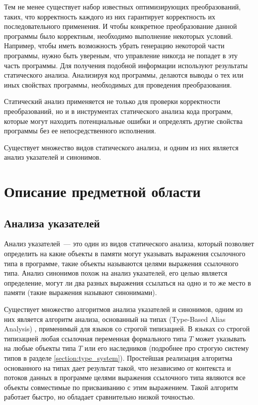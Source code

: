 \documentclass[14pt,titlepage]{extarticle}
\newcommand{\eng}[1]{{\English#1}}
\begin{document}
    Тем не менее существует набор известных оптимизирующих преобразований,
    таких, что корректность каждого из них гарантирует корректность их
    последовательного применения.
    И чтобы конкретное преобразование данной программы было корректным,
    необходимо выполнение некоторых условий. Например, чтобы иметь
    возможность убрать генерацию некоторой части программы, нужно быть
    увереным, что управление никогда не попадет в эту часть программы.
    Для получения подобной информации используют результаты статического
    анализа. Анализируя код программы, делаются выводы о тех или иных свойствах
    программы, необходимых для проведения преобразования.

    Статический анализ применяется не только для проверки
    корректности преобразований, но и в инструментах статического анализа
    кода программ, которые могут находить потенциальные ошибки и определять
    другие свойства программы без ее непосредственного исполнения.

    Существует множество видов статического анализа, и одним из них
    является анализ указателей и синонимов.

  \newpage
  \section{Описание предметной области}

    \subsection{Анализа указателей}
    \label{section:analysis_overview}

      Анализ указателей~--- это один из видов статического анализа, который
      позволяет определить на какие объекты в памяти могут указывать выражения
      ссылочного типа в программе, такие объекты называются целями выражения
      ссылочного типа. Анализ синонимов похож на анализ указателей, его целью
      является определение, могут ли два разных выражения ссылаться на одно и то
      же место в памяти (такие выражения называют синонимами).

      Существует множество алгоритмов анализа указателей и синонимов,
      одним из них является алгоритм анализа, основанный на типах
      (\eng{Type-Based Alias Analysis}) \cite{diwan_tbaa},
      применимый для языков со строгой типизацией.
      В языках со строгой типизацией любая ссылочная переменная формального типа
      $T$ может указывать на любые объекты типа $T$ или его наследников
      (подробнее про строгую систему типов в разделе \ref{section:type_system}).
      Простейшая реализация алгоритма основанного на типах дает результат такой,
      что независимо от контекста и потоков данных в программе целями выражения
      ссылочного типа являются все объекты совместимые по присваиванию с этим
      выражением.
      Такой алгоритм работает быстро, но обладает сравнительно низкой точностью.
\end{document}
